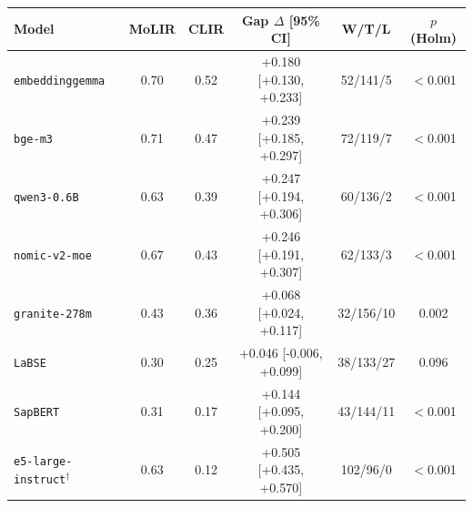 \begin{tabular}{lccccc}
\toprule
Model & MoLIR & CLIR & Gap $\Delta$ [95\% CI] & W/T/L & $p$ (Holm) \\
\midrule
\texttt{embeddinggemma} & 0.70 & 0.52 & +0.180 [+0.130, +0.233] & 52/141/5 & $<$0.001 \\
\texttt{bge-m3} & 0.71 & 0.47 & +0.239 [+0.185, +0.297] & 72/119/7 & $<$0.001 \\
\texttt{qwen3-0.6B} & 0.63 & 0.39 & +0.247 [+0.194, +0.306] & 60/136/2 & $<$0.001 \\
\texttt{nomic-v2-moe} & 0.67 & 0.43 & +0.246 [+0.191, +0.307] & 62/133/3 & $<$0.001 \\
\texttt{granite-278m} & 0.43 & 0.36 & +0.068 [+0.024, +0.117] & 32/156/10 & 0.002 \\
\texttt{LaBSE} & 0.30 & 0.25 & +0.046 [-0.006, +0.099] & 38/133/27 & 0.096 \\
\texttt{SapBERT} & 0.31 & 0.17 & +0.144 [+0.095, +0.200] & 43/144/11 & $<$0.001 \\
\texttt{e5-large-instruct$^\dagger$} & 0.63 & 0.12 & +0.505 [+0.435, +0.570] & 102/96/0 & $<$0.001 \\
\bottomrule
\end{tabular}
